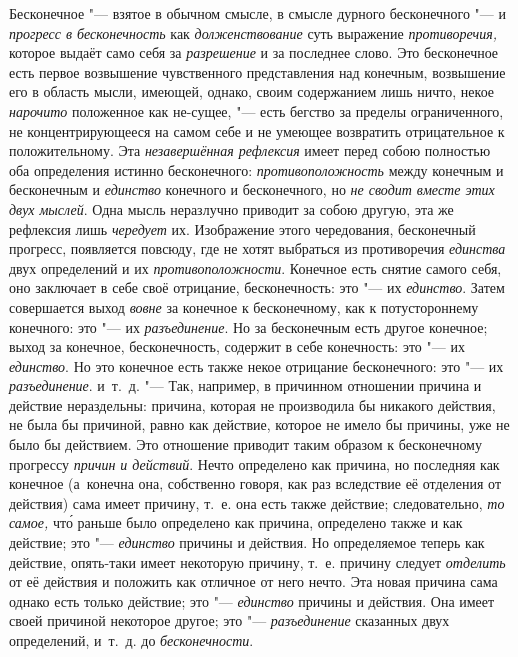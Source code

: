 
Бесконечное "--- взятое в обычном смысле, в смысле дурного бесконечного "--- и
{\em прогресс в бесконечность} как {\em долженствование} суть выражение
{\em противоречия,} которое выдаёт само себя за
{\em разрешение} и за последнее слово. Это бесконечное
есть первое возвышение чувственного представления над конечным, возвышение
его в область мысли, имеющей, однако, своим содержанием лишь ничто, некое
{\em нарочито} положенное как не-сущее, "--- есть бегство
за пределы ограниченного, не концентрирующееся на самом себе и не умеющее
возвратить отрицательное к положительному. Эта
{\em незавершённая рефлексия} имеет перед собою
полностью оба определения истинно бесконечного:
{\em противоположность} между конечным и бесконечным и
{\em единство} конечного и бесконечного, но
{\em не сводит вместе этих двух мыслей}. Одна мысль
неразлучно приводит за собою другую, эта же рефлексия лишь
{\em чередует} их. Изображение этого чередования,
бесконечный прогресс, появляется повсюду, где не хотят выбраться из
противоречия {\em единства} двух определений и их
{\em противоположности}. Конечное есть снятие самого
себя, оно заключает в себе своё отрицание, бесконечность: это "--- их
{\em единство}. Затем совершается выход
{\em вовне} за конечное к бесконечному, как к
потустороннему конечного: это "--- их {\em разъединение}.
Но за бесконечным есть другое конечное; выход за конечное, бесконечность,
содержит в себе конечность: это "--- их {\em единство}. Но
это конечное есть также некое отрицание бесконечного: это "--- их
{\em разъединение}. и~т.~д. "--- Так, например, в
причинном отношении причина и действие нераздельны: причина, которая не
производила бы никакого действия, не была бы причиной, равно как действие,
которое не имело бы причины, уже не было бы действием. Это отношение
приводит таким образом к бесконечному прогрессу
{\em причин и действий}. Нечто определено как причина,
но последняя как конечное (а~конечна она, собственно говоря, как раз
вследствие её отделения от действия) сама имеет причину, т.~е. она есть
также действие; следовательно, {\em то самое,} чт\'{о}
раньше было определено как причина, определено также и как действие; это
"--- {\em единство} причины и действия. Но определяемое
теперь как действие, опять-таки имеет некоторую причину, т.~е. причину
следует {\em отделить} от её действия и положить как
отличное от него нечто. Эта новая причина сама однако есть только действие;
это "--- {\em единство} причины и действия. Она имеет
своей причиной некоторое другое; это
"--- {\em разъединение} сказанных двух определений,
и~т.~д. до {\em бесконечности}.

